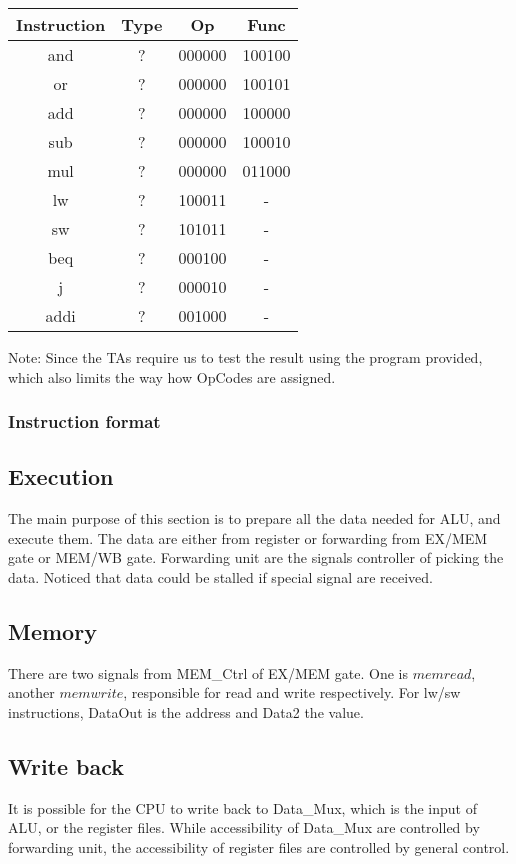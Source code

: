 \documentclass[11pt, a4paper, twoside]{article}
\begin{document}
\begin{table}[h]
	\centering
	\begin{tabular}{|c|ccc|}
	\hline
    Instruction & Type & Op & Func\\
    \hline
    and & ? & 000000 & 100100 \\
    or & ? & 000000 & 100101 \\
    add & ? & 000000 & 100000 \\
    sub & ? & 000000 & 100010 \\
    mul & ? & 000000 & 011000 \\
    lw & ? & 100011 & - \\
    sw & ? & 101011 & - \\
    beq & ? & 000100 & - \\
    j & ? & 000010 & - \\
    addi & ? & 001000 & - \\
    \hline
	\end{tabular}
\end{table}

Note: Since the TAs require us to test the result using the program provided, which also limits the way how OpCodes are assigned.\\

\subsubsection{Instruction format}

\subsection{Execution}
The main purpose of this section is to prepare all the data needed for ALU, and execute them. The data are either from register or forwarding from EX/MEM gate or MEM/WB gate. Forwarding unit are the signals controller of picking the data. Noticed that data could be stalled if special signal are received. 

\subsection{Memory}
There are two signals from MEM\_Ctrl of EX/MEM gate. One is $memread$, another $memwrite$, responsible for read and write respectively. For lw/sw instructions, DataOut is the address and Data2 the value.

\subsection{Write back}
It is possible for the CPU to write back to Data\_Mux, which is the input of ALU, or the register files. While accessibility of Data\_Mux are controlled by forwarding unit, the accessibility of register files are controlled by general control.
\end{document}
